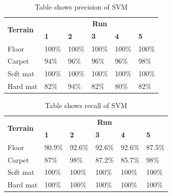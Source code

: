 \documentclass[USenglish]{ifimaster}  %
\begin{document}
	\begin{table}[h]
		\centering
		\begin{tabular}{@{}llllll@{}}
			\toprule
			\multirow{2}{*}{\textbf{Terrain}} & \multicolumn{5}{c}{\textbf{Run}} \\ \cmidrule(l){2-6} 
			& \multicolumn{1}{l|}{\textbf{1}} & \multicolumn{1}{l|}{\textbf{2}} & \multicolumn{1}{l|}{\textbf{3}} & \multicolumn{1}{l|}{\textbf{4}} & \textbf{5} \\ \midrule
			\multicolumn{1}{l|}{Floor} & \multicolumn{1}{l|}{100\%} & \multicolumn{1}{l|}{100\%} & \multicolumn{1}{l|}{100\%} & \multicolumn{1}{l|}{100\%} & 100\% \\ \midrule
			\multicolumn{1}{l|}{Carpet} & \multicolumn{1}{l|}{94\%} & \multicolumn{1}{l|}{96\%} & \multicolumn{1}{l|}{96\%} & \multicolumn{1}{l|}{96\%} & 98\% \\ \midrule
			\multicolumn{1}{l|}{Soft mat} & \multicolumn{1}{l|}{100\%} & \multicolumn{1}{l|}{100\%} & \multicolumn{1}{l|}{100\%} & \multicolumn{1}{l|}{100\%} & 100\% \\ \midrule
			\multicolumn{1}{l|}{Hard mat} & \multicolumn{1}{l|}{82\%} & \multicolumn{1}{l|}{94\%} & \multicolumn{1}{l|}{82\%} & \multicolumn{1}{l|}{80\%} & 82\% \\ \bottomrule
		\end{tabular}
		\caption{Table shows precision of SVM}
		\label{pressvm}
	\end{table}
	\FloatBarrier
	
	\begin{table}[h]
		\centering
		\begin{tabular}{@{}llllll@{}}
			\toprule
			\multirow{2}{*}{\textbf{Terrain}} & \multicolumn{5}{c}{\textbf{Run}} \\ \cmidrule(l){2-6} 
			& \multicolumn{1}{l|}{\textbf{1}} & \multicolumn{1}{l|}{\textbf{2}} & \multicolumn{1}{l|}{\textbf{3}} & \multicolumn{1}{l|}{\textbf{4}} & \textbf{5} \\ \midrule
			\multicolumn{1}{l|}{Floor} & \multicolumn{1}{l|}{90.9\%} & \multicolumn{1}{l|}{92.6\%} & \multicolumn{1}{l|}{92.6\%} & \multicolumn{1}{l|}{92.6\%} & 87.5\% \\ \midrule
			\multicolumn{1}{l|}{Carpet} & \multicolumn{1}{l|}{87\%} & \multicolumn{1}{l|}{98\%} & \multicolumn{1}{l|}{87.2\%} & \multicolumn{1}{l|}{85.7\%} & 98\% \\ \midrule
			\multicolumn{1}{l|}{Soft mat} & \multicolumn{1}{l|}{100\%} & \multicolumn{1}{l|}{100\%} & \multicolumn{1}{l|}{100\%} & \multicolumn{1}{l|}{100\%} & 100\% \\ \midrule
			\multicolumn{1}{l|}{Hard mat} & \multicolumn{1}{l|}{100\%} & \multicolumn{1}{l|}{100\%} & \multicolumn{1}{l|}{100\%} & \multicolumn{1}{l|}{100\%} & 100\% \\ \bottomrule
		\end{tabular}
		\caption{Table shows recall of SVM}
		\label{recallsvm}
	\end{table}
	\FloatBarrier
	
\end{document}

